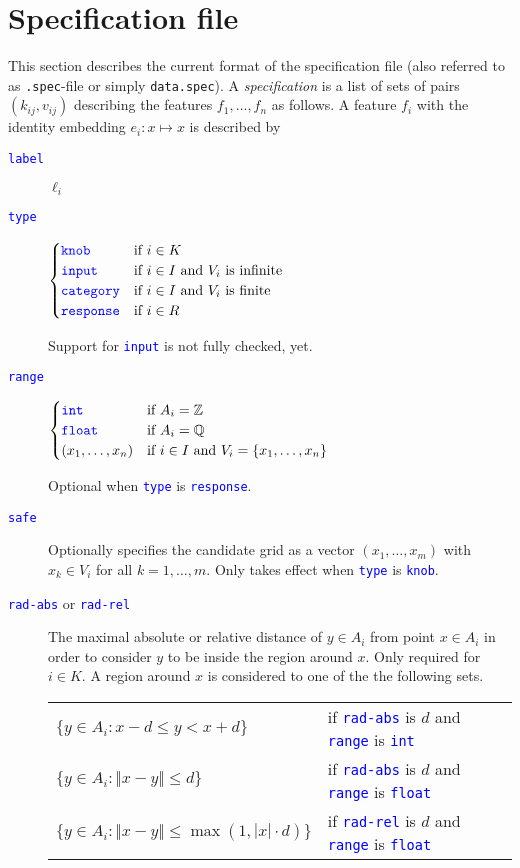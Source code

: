 \documentclass[a4paper,parskip=half]{scrartcl}
\newcommand*\spec[1]{\textcolor{blue}{\texttt{#1}}}
\begin{document}
\section{Specification file}
This section describes the current format of the specification file
(also referred to as \texttt{.spec}-file or simply \texttt{data.spec}).
A \emph{specification} is a list of sets of pairs $(k_{ij},v_{ij})$ describing
the features $f_1,\ldots,f_n$ as follows.
%
A feature $f_i$ with the identity embedding $e_i:x\mapsto x$ is described by
\begin{description}
\item[\spec{label}] $\ell_i$
\item[\spec{type}]
	$\begin{cases}
		\spec{knob}     & \text{if}~i\in K \\
		\spec{input}    & \text{if}~i\in I~\text{and}~V_i~\text{is infinite} \\
		\spec{category} & \text{if}~i\in I~\text{and}~V_i~\text{is finite} \\
		\spec{response} & \text{if}~i\in R
	\end{cases}$

	Support for \spec{input} is not fully checked, yet.
\item[\spec{range}]
	$\begin{cases}
		\spec{int} & \text{if}~A_i=\mathbb Z \\
		\spec{float} & \text{if}~A_i=\mathbb Q \\
		(x_1,\ldots,x_n) & \text{if}~i\in I~\text{and}~V_i=\{x_1,\ldots,x_n\}
	\end{cases}$

	Optional when \spec{type} is \spec{response}.
\item[\spec{safe}]
	Optionally specifies the candidate grid as a vector $(x_1,\ldots,x_m)$
	with $x_k\in V_i$ for all $k=1,\ldots,m$.
	Only takes effect when \spec{type} is \spec{knob}.
\item[\spec{rad-abs} or \spec{rad-rel}]
	The maximal absolute or relative distance of $y\in A_i$ from point $x\in A_i$
	in order to consider $y$ to be inside the region around $x$.
	Only required for $i\in K$.
	A region around $x$ is considered to one of the the following sets.
	\begin{center}
	\begin{tabular}{ll}
		$\{y\in A_i:x-d\leq y<x+d\}$ &
			if \spec{rad-abs} is $d$ and \spec{range} is \spec{int} \\
		$\{y\in A_i:\Vert x-y\Vert\leq d\}$ &
			if \spec{rad-abs} is $d$ and \spec{range} is \spec{float} \\
		$\{y\in A_i:\Vert x-y\Vert\leq\max(1,|x|\cdot d)\}$ &
			if \spec{rad-rel} is $d$ and \spec{range} is \spec{float} \\
	\end{tabular}
	\end{center}
\end{description}
\end{document}
